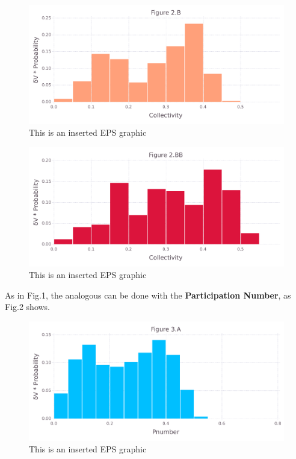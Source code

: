 \documentclass[10pt,letterpaper]{article}
\begin{document}
\begin{figure}[ht]
\begin{center}
\includegraphics[scale=0.5]{1prn/2bfigure.pdf}
\caption{This is an inserted EPS graphic}
\label{fig5}
\end{center}
\end{figure}

\begin{figure}[ht]
\begin{center}
\includegraphics[scale=0.5]{1prn/2bbfigure.pdf}
\caption{This is an inserted EPS graphic}
\label{fig6}
\end{center}
\end{figure}

\clearpage
As in Fig.1, the analogous can be done with the \textbf{Participation Number}, as Fig.2 shows.

\begin{figure}[ht]
\begin{center}
\includegraphics[scale=0.5]{1prn/3afigure.pdf}
\caption{This is an inserted EPS graphic}
\label{fig7}
\end{center}
\end{figure}
\end{document}
